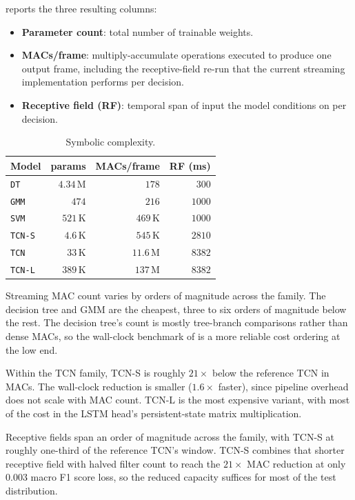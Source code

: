  reports the three resulting columns:
\begin{itemize}
    \item \textbf{Parameter count}: total number of trainable weights.
    \item \textbf{MACs/frame}: multiply-accumulate operations executed to produce one output frame, including the receptive-field re-run that the current streaming implementation performs per decision.
    \item \textbf{Receptive field (RF)}: temporal span of input the model conditions on per decision.
\end{itemize}

\begin{table}[h]
\centering
\small
\begin{tabular}{lrrr}
\toprule
\textbf{Model} & \textbf{params} & \textbf{MACs/frame} & \textbf{RF (ms)} \\
\midrule
\texttt{DT}    & $4.34$\,M & $178$     & $300$ \\
\texttt{GMM}   & $474$     & $216$     & $1000$ \\
\texttt{SVM}   & $521$\,K  & $469$\,K  & $1000$ \\
\texttt{TCN-S} & $4.6$\,K  & $545$\,K  & $2810$ \\
\texttt{TCN}   & $33$\,K   & $11.6$\,M & $8382$ \\
\texttt{TCN-L} & $389$\,K  & $137$\,M  & $8382$ \\
\bottomrule
\end{tabular}
\caption{Symbolic complexity.}
\label{tab:complexity_symbolic}
\end{table}

Streaming MAC count varies by orders of magnitude across the family.
The decision tree and GMM are the cheapest, three to six orders of magnitude below the rest.
The decision tree's count is mostly tree-branch comparisons rather than dense MACs, so the wall-clock benchmark of  is a more reliable cost ordering at the low end.

Within the TCN family, TCN-S is roughly $21\times$ below the reference TCN in MACs.
The wall-clock reduction is smaller ($1.6\times$ faster), since pipeline overhead does not scale with MAC count.
TCN-L is the most expensive variant, with most of the cost in the LSTM head's persistent-state matrix multiplication.

Receptive fields span an order of magnitude across the family, with TCN-S at roughly one-third of the reference TCN's window.
TCN-S combines that shorter receptive field with halved filter count to reach the $21\times$ MAC reduction at only $0.003$ macro F1 score loss, so the reduced capacity suffices for most of the test distribution.

